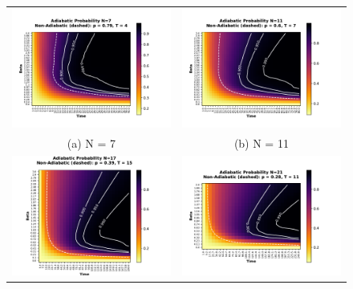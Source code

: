 \documentclass[aps,pra,reprint, onecolumn, showkeys]{revtex4-2}
\begin{document}
\begin{figure}
\begin{tabular}{cc}
  \includegraphics[width=90mm]{./figures/7_probability_heatmap.pdf} &   \includegraphics[width=90mm]{./figures/11_probability_heatmap.pdf} \\
(a) N = 7 & (b) N = 11\\[6pt]
\includegraphics[width=90mm]{./figures/17_probability_heatmap.pdf} &   \includegraphics[width=90mm]{./figures/21_probability_heatmap.pdf} \\

\end{tabular}
\end{figure}
\end{document}
